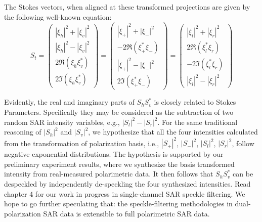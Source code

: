 The Stokes vectors, when aligned at these transformed projections are given by the following well-known equation:
\begin{equation}
S_t = \left(
\begin{array}{c}
 |\xi_h|^2 + |\xi_v|^2 \\
 |\xi_h|^2 - |\xi_v|^2 \\
 2 \Re( \xi_h \xi_v^* ) \\
 2 \Im( \xi_h \xi_v^* ) 
\end{array}
\right)
= \left(
\begin{array}{c}
 |\xi_+|^2 + |\xi_-|^2 \\
 -2 \Re( \xi_+^* \xi_- ) \\
 |\xi_+|^2 - |\xi_-|^2 \\
 2 \Im( \xi_+^* \xi_- ) 
\end{array}
\right)
= \left(
\begin{array}{c}
 |\xi_l|^2 + |\xi_r|^2 \\
 2 \Re( \xi_l^* \xi_r ) \\
 -2 \Im( \xi_l^* \xi_r ) \\ 
 |\xi_l|^2 - |\xi_r|^2 
\end{array}
\right)  
\end{equation}

Evidently, the real and imaginary parts of $S_hS_v^*$ is closely related to Stokes Parameters.
Specifically they may be considered as the subtraction of two random SAR intensity variables, e.g., $|S_l|^2 - |S_r|^2$. 
For the same traditional reasoning of $|S_h|^2$ and $|S_v|^2$, we hypothesize that all the four intensities calculated from the transformation of polarization basis, i.e., $|S_+|^2$, $|S_-|^2$, $|S_l|^2$, $|S_r|^2$, follow negative exponential distributions. 
The hypothesis is supported by our preliminary experiment results, where we synthesize the basis transformed intensity from real-measured polarimetric data.
It then follows that $S_hS_v^*$ can be despeckled by independently de-speckling the four synthesized intensities.
Read chapter 4 for our work in progress in single-channel SAR speckle filtering.
We hope to go further speculating that: the speckle-filtering methodologies in dual-polarization SAR data is extensible to full polarimetric SAR data.


